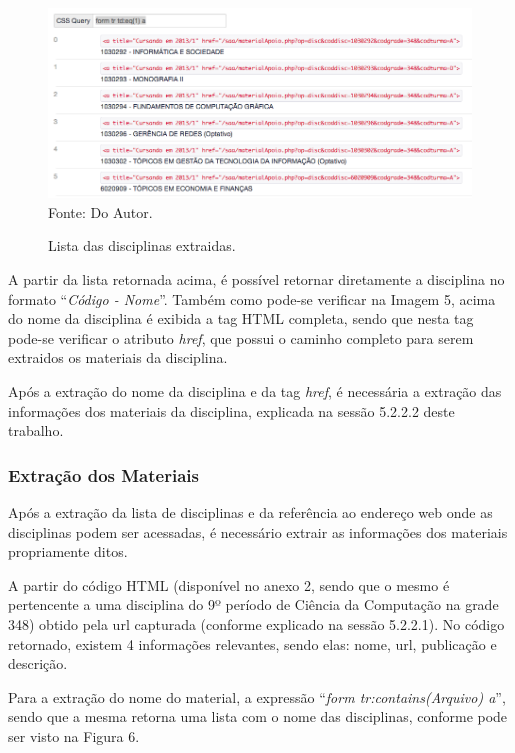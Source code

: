 \begin{figure}[!htb]
     \centering
     \caption[Extração de Informações - Lista de Disciplinas do Material de Apoio]{Lista das disciplinas extraidas.}
     \includegraphics[scale=0.5]{imagens/listadisciplinasmaterialapoio.png}
     \\ Fonte: Do Autor.
\end{figure}

A partir da lista retornada acima, é possível retornar diretamente a disciplina no formato ``\emph{Código - Nome}''. Também como pode-se verificar na Imagem 5, acima do nome da disciplina é exibida a tag HTML completa, sendo que nesta tag pode-se verificar o atributo \emph{href}, que possui o caminho completo para serem extraidos os materiais da disciplina.

Após a extração do nome da disciplina e da tag \emph{href}, é necessária a extração das informações dos materiais da disciplina, explicada na sessão 5.2.2.2 deste trabalho.

\subsubsection{Extração dos Materiais}
Após a extração da lista de disciplinas e da referência ao endereço web onde as disciplinas podem ser acessadas, é necessário extrair as informações dos materiais propriamente ditos.

A partir do código HTML (disponível no anexo 2, sendo que o mesmo é pertencente a uma disciplina do 9º período de Ciência da Computação na grade 348) obtido pela url capturada (conforme explicado na sessão 5.2.2.1). No código retornado, existem 4 informações relevantes, sendo elas: nome, url, publicação e descrição.

Para a extração do nome do material, a expressão ``\emph{form tr:contains(Arquivo) a}'', sendo que a mesma retorna uma lista com o nome das disciplinas, conforme pode ser visto na Figura 6.

